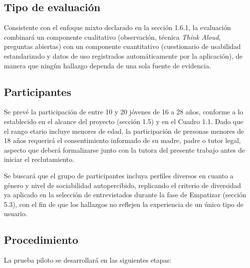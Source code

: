 \subsection{Tipo de evaluación}
Consistente con el enfoque mixto declarado en la sección 1.6.1, la evaluación combinará un componente cualitativo (observación, técnica \textit{Think Aloud}, preguntas abiertas) con un componente cuantitativo (cuestionario de usabilidad estandarizado y datos de uso registrados automáticamente por la aplicación), de manera que ningún hallazgo dependa de una sola fuente de evidencia.

\subsection{Participantes}
Se prevé la participación de entre 10 y 20 jóvenes de 16 a 28 años, conforme a lo establecido en el alcance del proyecto (sección 1.5) y en el Cuadro 1.1. Dado que el rango etario incluye menores de edad, la participación de personas menores de 18 años requerirá el consentimiento informado de su madre, padre o tutor legal, aspecto que deberá formalizarse junto con la tutora del presente trabajo antes de iniciar el reclutamiento.

Se buscará que el grupo de participantes incluya perfiles diversos en cuanto a género y nivel de sociabilidad autopercibido, replicando el criterio de diversidad ya aplicado en la selección de entrevistados durante la fase de Empatizar (sección 5.3), con el fin de que los hallazgos no reflejen la experiencia de un único tipo de usuario.

\subsection{Procedimiento}
La prueba piloto se desarrollará en las siguientes etapas:

